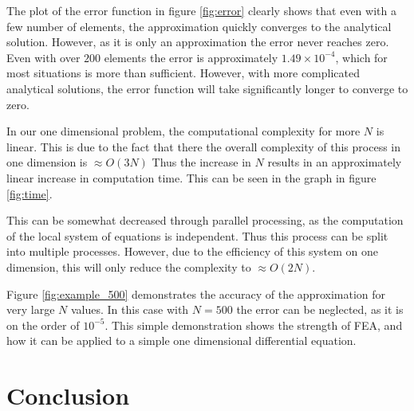 \documentclass[10pt]{amsart}
\numberwithin{equation}{section}
\newenvironment{Figure}
{\par\medskip\noindent\minipage{\linewidth}}
{\endminipage\par\medskip}
\theoremstyle{definition}
\begin{document}
\begin{multicols}{2}
The plot of the error function in figure \ref{fig:error} clearly shows that
even with a few number of elements, the approximation quickly converges to the
analytical solution. However, as it is only an approximation the error never
reaches zero. Even with over $200$ elements the error is approximately
$1.49\times 10^{-4}$, which for most situations is more than sufficient.
However, with more complicated analytical solutions, the error function will
take significantly longer to converge to zero.

In our one dimensional problem, the computational complexity for more $N$ is
linear. This is due to the fact that there the overall complexity of this
process in one dimension is $\approx O(3N)$ Thus the increase in $N$ results in
an approximately linear increase in computation time. This can be seen in the
graph in figure \ref{fig:time}.

\begin{Figure}
   \begin{center}
     
   \end{center}
\end{Figure}

This can be somewhat decreased through parallel processing, as the computation
of the local system of equations is independent. Thus this process can be
split into multiple processes. However, due to the efficiency of this system on
one dimension, this will only reduce the complexity to $\approx O(2N)$.

\begin{Figure}
   \begin{center}
     
   \end{center}
  \label{fig:example_500}
\end{Figure}

Figure \ref{fig:example_500} demonstrates the accuracy of the approximation for
very large $N$ values. In this case with $N=500$ the error can be neglected, as
it is on the order of $10^{-5}$. This simple demonstration shows the strength
of FEA, and how it can be applied to a simple one dimensional differential
equation.

\section{Conclusion}%
\label{sec:conclusion}


\end{multicols}
\end{document}
